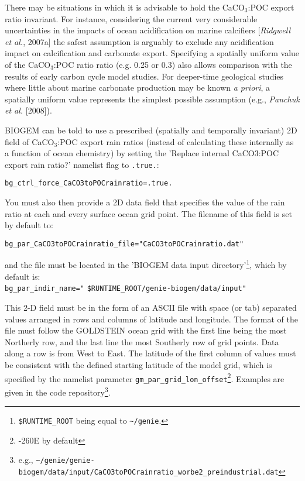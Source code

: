 \documentclass[10pt,twoside]{article}
\begin{document}
There may be situations in which it is advisable to hold the CaCO\begin{math}_3\end{math}:POC export ratio invariant. For instance, considering the current very considerable uncertainties in the impacts of ocean acidification on marine calcifiers [\textit{Ridgwell et al.}, 2007a] the safest assumption is arguably to exclude any acidification impact on calcification and carbonate export. Specifying a spatially uniform value of the CaCO\begin{math}_3\end{math}:POC ratio ratio (e.g. 0.25 or 0.3) also allows comparison with the results of early carbon cycle model studies. For deeper-time geological studies where little about marine carbonate production may be known \textit{a priori}, a spatially uniform value represents the simplest possible assumption (e.g., \textit{Panchuk et al.} [2008]).

BIOGEM can be told to use a prescribed (spatially and temporally invariant) 2D field of CaCO\begin{math}_3\end{math}:POC export rain ratios (instead of calculating these internally as a function of ocean chemistry) by setting the 'Replace internal CaCO3:POC export rain ratio?' namelist flag to \texttt{.true.}:
\vspace{-5.5pt}\begin{verbatim}
bg_ctrl_force_CaCO3toPOCrainratio=.true.
\end{verbatim}\vspace{-5.5pt}
You must also then provide a 2D data field that specifies the value of the rain ratio at each and every surface ocean grid point. The filename of this field is set by default to:
\vspace{-5.5pt}\begin{verbatim}
bg_par_CaCO3toPOCrainratio_file="CaCO3toPOCrainratio.dat"
\end{verbatim}\vspace{-5.5pt}
and the file must be located in the 'BIOGEM data input directory'\footnote{\texttt{\$RUNTIME\_ROOT} being equal to \texttt{\~{}/genie}.}, which by default is:
\\\texttt{bg\_par\_indir\_name="} \texttt{\$RUNTIME\_ROOT/genie-biogem/data/input"}

This 2-D field must be in the form of an ASCII file with space (or tab) separated values arranged in rows and columns of latitude and longitude. The format of the file must follow the GOLDSTEIN ocean grid with the first line being the most Northerly row, and the last line the most Southerly row of grid points. Data along a row is from West to East. The latitude of the first column of values must be consistent with the defined starting latitude of the model grid, which is specified by the namelist parameter \texttt{gm\_par\_grid\_lon\_offset}\footnote{-260E by default}. Examples are given in the code repository\footnote{e.g., \texttt{\~{}/genie/genie-biogem/data/input/CaCO3toPOCrainratio\_worbe2\_preindustrial.dat}}.
\end{document}

